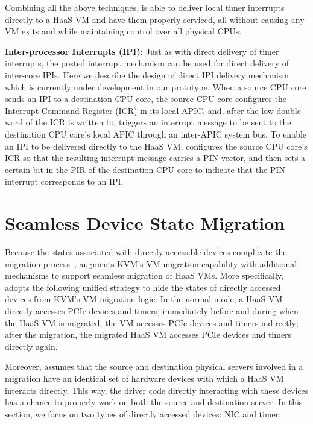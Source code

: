 Combining all the above techniques, \na is able to deliver local timer interrupts
directly to a HaaS VM and have them properly serviced,
all without causing any VM exits and while maintaining control over all physical CPUs.


{\bf Inter-processor Interrupts (IPI):}
Just as with direct delivery of timer interrupts, the posted interrupt mechanism can be used for direct delivery of inter-core IPIs.
Here we describe the design of direct IPI delivery mechanism which is currently under development in our prototype.
When a source CPU core sends an IPI to a destination CPU core, the source CPU core configures the Interrupt Command Register (ICR) in its local APIC,
and, after the low double-word of the ICR is written to, triggers an interrupt message to be sent to the destination CPU core's local APIC through an inter-APIC system bus.
To enable an IPI to be delivered directly to the HaaS VM, \na configures the source CPU core's ICR so that the resulting interrupt message carries a PIN vector,
and then sets a certain bit in the PIR of the destination CPU core to indicate that the PIN interrupt corresponds to an IPI.




\vspace{-0.1in}
\section{Seamless Device State Migration}
\vspace{-0.05in}

Because the states associated with directly accessible devices complicate the migration process~\cite{zhai:2008},
\na augments KVM's VM migration capability with additional mechanisms to support seamless migration of HaaS VMs.
More specifically, \na adopts the following unified strategy to hide the states of directly accessed devices from KVM's VM migration logic:
In the normal mode, a HaaS VM directly accesses PCIe devices and timers; immediately before and during when the HaaS VM is migrated,  the VM
accesses PCIe devices and timers indirectly; after the migration, the migrated HaaS VM accesses PCIe devices and timers directly again.

Moreover, \na assumes that the source and destination physical servers involved in a migration have an identical
set of hardware devices with which a HaaS VM interacts directly.
This way, the driver code directly interacting with these devices has a chance to properly work on
both the source and destination server.
In this section, we focus on two types of directly accessed devices: NIC and timer.



